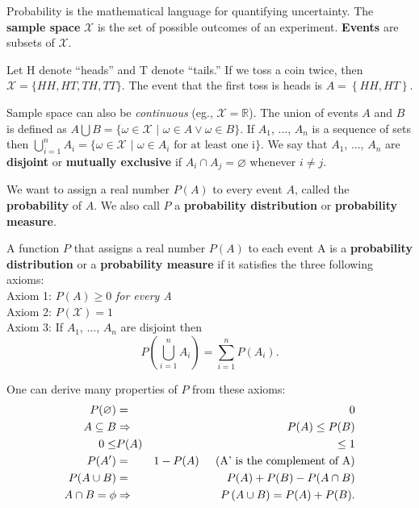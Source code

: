 Probability is the mathematical language for quantifying uncertainty. 
The {\bf sample space} $\mathcal{X}$ is the set of possible outcomes of an experiment.
{\bf Events} are subsets of $\mathcal{X}$.

\begin{example}
 Let H denote ``heads'' and T denote ``tails.'' If we toss a coin twice, then $\mathcal{X}=\{ HH, HT, 
TH, TT\}$. The event that the first toss is heads is $A= \left\{HH, HT \right\}$.
\end{example}

Sample space can also be {\em continuous} (eg., $\mathcal{X}= \mathbb{R}$). The union of events $A$ and $B$ is 
defined as $A \bigcup B = \{ \omega \in \mathcal{X}\,\,|\,\, \omega \in A \vee \omega \in B\}$. 
If $A_1$, $\ldots$, $A_n$  is a sequence of sets 
then $\bigcup\limits_{i=1}^{n}A_{i} = \{ \omega \in \mathcal{X}\,\,|\,\, \omega \in A_{i} \text{ for at least one i}\}$.
We say that  $A_1$, $\ldots$, $A_n$ are {\bf disjoint} or {\bf mutually exclusive} if $A_{i} \cap A_{j} = \varnothing$ 
whenever $i \neq j$.

\vspace{0.1in}
We want to assign a real number $P(A)$  to every event $A$, called the {\bf probability} of $A$. We also
call $P$ a {\bf probability distribution} or {\bf probability measure}. 

\bigskip

\fbox
{\begin{minipage}[h]{0.9\linewidth} 
\begin{definition}
A function $P$ that assigns a real number $P(A)$ to each event A is a {\bf probability distribution} or a {\bf probability
measure} if it satisfies the three following axioms: \\

Axiom 1: $P(A) \geq 0$ {\em for every A} \\
Axiom 2: $P(\mathcal{X}) = 1$ \\
Axiom 3: If  $A_1$, $\ldots$, $A_n$ are disjoint then 
\begin{equation*}
P\left(\bigcup\limits_{i=1}^{n} A_{i}\right) = \sum\limits_{i=1}^{n} P(A_{i}).
\end{equation*}
\end{definition}
\end{minipage}}

\vspace{0.1in}
One can derive many properties of $P$ from these axioms:
\begin{eqnarray*}
P(\varnothing) &= &0 \\
A \subseteq B &\Rightarrow &P(A) \leq P(B) \\
0 \leq &P(A) &\leq 1 \\
P(A') &= &1 - P(A) \hspace{0.2in}(\text{A' is the complement of A}) \\
P(A \cup B) &=& P(A) + P(B) - P(A \cap B) \\
A \cap B = \phi &\Rightarrow &P\left( A \cup B\right) = P(A) + P(B).
\end{eqnarray*}

